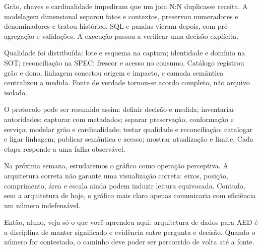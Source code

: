 Grão, chaves e cardinalidade impediram que um join N:N duplicasse receita. A modelagem dimensional separou fatos e contextos, preservou numeradores e denominadores e tratou histórico. SQL e pandas vieram depois, com pré-agregação e validações. A execução passou a verificar uma decisão explícita.

Qualidade foi distribuída: lote e esquema na captura; identidade e domínio na SOT; reconciliação na SPEC; frescor e acesso no consumo. Catálogo registrou grão e dono, linhagem conectou origem e impacto, e camada semântica centralizou a medida. Fonte de verdade tornou-se acordo completo, não arquivo isolado.

O protocolo pode ser resumido assim: definir decisão e medida; inventariar autoridades; capturar com metadados; separar preservação, conformação e serviço; modelar grão e cardinalidade; testar qualidade e reconciliação; catalogar e ligar linhagem; publicar semântica e acesso; mostrar atualização e limite. Cada etapa responde a uma falha observável.

Na próxima semana, estudaremos o gráfico como operação perceptiva. A arquitetura correta não garante uma visualização correta: eixos, posição, comprimento, área e escala ainda podem induzir leitura equivocada. Contudo, sem a arquitetura de hoje, o gráfico mais claro apenas comunicaria com eficiência um número indefensável.

\begin{SummaryBox}
Então, aluno, veja só o que você aprendeu aqui: arquitetura de dados para AED é a disciplina de manter significado e evidência entre pergunta e decisão. Quando o número for contestado, o caminho deve poder ser percorrido de volta até a fonte.
\end{SummaryBox}
